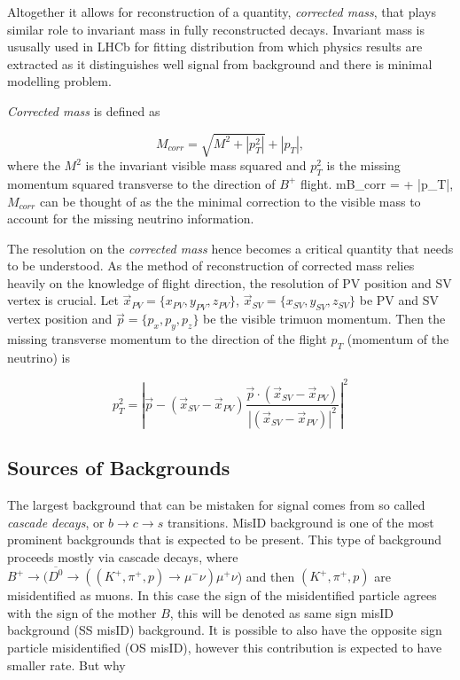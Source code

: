 Altogether it allows for reconstruction of a quantity, \textit{corrected mass}, that plays similar role to invariant mass in fully reconstructed decays. Invariant mass is ususally used in \Gls{LHCb} for fitting distribution from which physics results are extracted as it distinguishes well signal from background and there is minimal modelling problem.

\textit{Corrected mass} is defined as

\begin{equation}
	M_{corr} = \sqrt{{M}^{2} + |p^{2}_{T}|} + |p_{T}|,
\end{equation}	
where the $M^{2}$ is the invariant visible mass squared and $p^{2}_{T}$ is the missing momentum squared transverse to the direction of $B^{+}$ flight.
m{{B_{corr}}} =  + |p_{T}|,
$M_{corr}$ can be thought of as the the minimal correction to the visible mass to account for the missing neutrino information. 


The resolution on the \textit{corrected mass} hence becomes a critical quantity that needs to be understood. As the method of 
reconstruction of corrected mass relies heavily on the knowledge of \Bpm flight direction, the resolution of \Gls{PV} 
position and \Gls{SV} vertex is crucial. Let $\overrightarrow{{x}}_{PV}=\{x_{PV},y_{PV},z_{PV}\}$, $\overrightarrow{{x}}_{SV}=\{x_{SV},y_{SV},z_{SV}\} $ be \Gls{PV} and \Gls{SV} vertex position and $\overrightarrow{p}=\{p_{x},p_{y},p_{z}\}$ be the visible trimuon momentum. Then the missing transverse momentum to the direction of the flight $p_{T}$ (momentum of the neutrino) is

\begin{equation}
	p^{2}_{T} = |\overrightarrow{p} - (\overrightarrow{{x}}_{SV}-\overrightarrow{{x}}_{PV})\frac{\overrightarrow{p} \cdot(\overrightarrow{{x}}_{SV}-\overrightarrow{{x}}_{PV})}{|(\overrightarrow{{x}}_{SV}-\overrightarrow{{x}}_{PV})|^{2}}|^{2}
\end{equation}

\subsection{Sources of Backgrounds}
The largest background that can be mistaken for signal comes from so called \textit{cascade decays}, or $b \rightarrow c \rightarrow s$ transitions. MisID background is one of the most prominent backgrounds that is expected to be present. This type of background proceeds mostly via cascade decays,
where $B^{+} \rightarrow (\overline{D^{0}} \rightarrow ((K^{+},\pi^{+},p) \rightarrow \mu^{-} \nu) \mu^{+} \nu$) and then $(K^{+},\pi^{+},p)$ are misidentified as muons. In this case
the sign of the misidentified particle agrees with the sign of the mother $B$, this will be denoted as same sign misID background (SS misID) background.
It is possible to also have the opposite sign particle misidentified (OS misID), however this contribution is expected to have smaller rate. But why 
